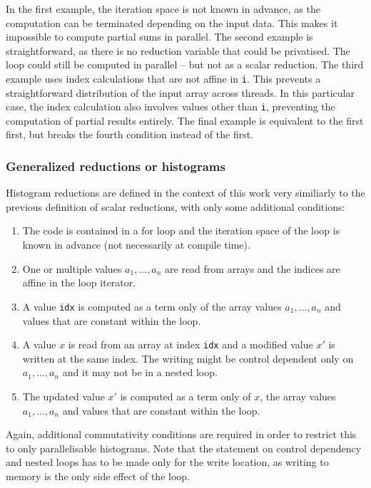     In the first example, the iteration space is not known in advance, as the
    computation can be terminated depending on the input data.
    This makes it impossible to compute partial sums in parallel.
    The second example is straightforward, as there is no reduction variable
    that could be privatised.
    The loop could still be computed in parallel -- but not as a scalar
    reduction.
    The third example uses index calculations that are not affine in \texttt{i}.
    This prevents a straightforward distribution of the input array across
    threads.
    In this particular case, the index calculation also involves values other
    than \texttt{i}, preventing the computation of partial results entirely.
    The final example is equivalent to the first first, but breaks the fourth
    condition instead of the first.

\subsubsection{Generalized reductions or histograms}

    Histogram reductions are defined in the context of this work very similiarly
    to the previous definition of scalar reductions, with only some additional
    conditions:
    \begin{enumerate}
        \item The code is contained in a for loop and the iteration space of the
              loop is known in advance (not necessarily at compile time).
        \item One or multiple values $a_1,\dots,a_n$ are read from arrays and
              the indices are affine in the loop iterator.
        \item A value {\tt idx} is computed as a term only of the array values
              $a_1,\dots,a_n$ and values that are constant within the loop.
        \item A value $x$ is read from an array at index {\tt idx} and a
              modified value $x'$ is written at the same index.
              The writing might be control dependent only on $a_1,\dots,a_n$ and
              it may not be in a nested loop.
        \item The updated value $x'$ is computed as a term only of $x$, the
              array values $a_1,\dots,a_n$ and values that are constant within
              the loop.
    \end{enumerate}

    Again, additional commutativity conditions are required in order to restrict
    this to only parallelisable histograms.
    Note that the statement on control dependency and nested loops has to be
    made only for the write location, as writing to memory is the only side
    effect of the loop.

